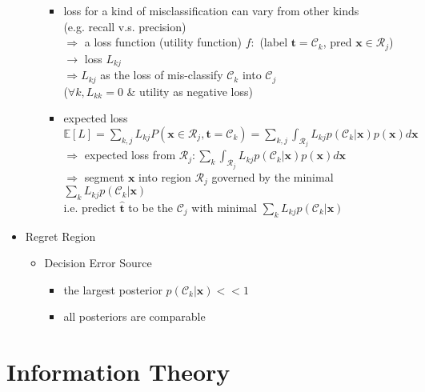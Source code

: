 \begin{itemize}
\begin{itemize}
\begin{itemize}
		\item loss for a kind of misclassification can vary from other kinds \\
		(e.g. recall v.s. precision) \\
		$\Rightarrow$ a loss function (utility function) $f:$ (label $\mathbf t=\mathcal C_k$, pred ${\mathbf x}\in\mathcal R_j$) $\rightarrow $ loss $L_{kj}$ \\
		$\Rightarrow L_{kj}$ as the loss of mis-classify $\mathcal C_k$ into $\mathcal C_j$ \\
		($\forall k, L_{kk}=0$ \& utility as negative loss)
		\item expected loss $\displaystyle \mathbb E[L] = \sum_{k,j}L_{kj}P(\mathbf x\in \mathcal R_{j}, \mathbf t=\mathcal C_k) = \sum_{k,j}\int_{\mathcal R_j}L_{kj} p(\mathcal C_k|\mathbf x)p(\mathbf x)d\mathbf x$ \\
		$\Rightarrow$ expected loss from $\displaystyle \mathcal R_j: \sum_k \int_{\mathcal R_j}L_{kj} p(\mathcal C_k|\mathbf x)p(\mathbf x) d\mathbf x$ \\
		$\Rightarrow$ segment $\mathbf x$ into region $\mathcal R_j$ governed by the minimal $\displaystyle \sum_{k}L_{kj}p(\mathcal C_k|\mathbf x)$ \\
		i.e. predict $\hat{\mathbf t}$ to be the $\mathcal C_j$ with minimal $\displaystyle \sum_{k}L_{kj}p(\mathcal C_k|\mathbf x)$
		\end{itemize}
	\end{itemize}
\item Regret Region
	\begin{itemize}
	\item Decision Error Source
		\begin{itemize}
		\item the largest posterior $p(\mathcal C_k|\mathbf x) << 1$
		\item all posteriors are comparable
		\end{itemize}
	\end{itemize}
\end{itemize}

\section{Information Theory}
\subsection{}


